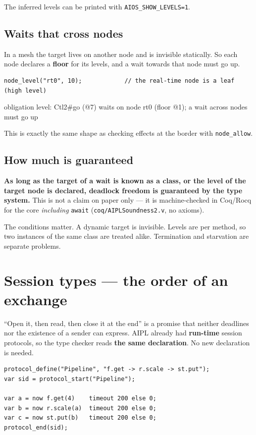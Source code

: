 \documentclass[11pt,a4paper]{article}
\begin{document}
The inferred levels can be printed with \texttt{AIOS\_SHOW\_LEVELS=1}.

\subsection{Waits that cross nodes}

In a mesh the target lives on another node and is invisible statically. So each
node declares a \textbf{floor} for its levels, and a wait towards that node
must go up.

\begin{lstlisting}
node_level("rt0", 10);            // the real-time node is a leaf (high level)
\end{lstlisting}

\begin{term}
obligation level: Ctl2#go (@7) waits on node rt0 (floor @1);
                  a wait across nodes must go up
\end{term}

This is exactly the same shape as checking effects at the border with
\texttt{node\_allow}.

\subsection{How much is guaranteed}

\textbf{As long as the target of a wait is known as a class, or the level of the
target node is declared, deadlock freedom is guaranteed by the type system.}
This is not a claim on paper only --- it is machine-checked in Coq/Rocq for the
core \emph{including} \texttt{await} (\texttt{coq/AIPLSoundness2.v}, no axioms).

The conditions matter. A dynamic target is invisible. Levels are per method, so
two instances of the same class are treated alike. Termination and starvation
are separate problems.

\section{Session types --- the order of an exchange}
\label{sec:session}

``Open it, then read, then close it at the end'' is a promise that neither
deadlines nor the existence of a sender can express. AIPL already had
\textbf{run-time} session protocols, so the type checker reads
\textbf{the same declaration}. No new declaration is needed.

\begin{lstlisting}
protocol_define("Pipeline", "f.get -> r.scale -> st.put");
var sid = protocol_start("Pipeline");

var a = now f.get(4)    timeout 200 else 0;
var b = now r.scale(a)  timeout 200 else 0;
var c = now st.put(b)   timeout 200 else 0;
protocol_end(sid);
\end{lstlisting}
\end{document}
